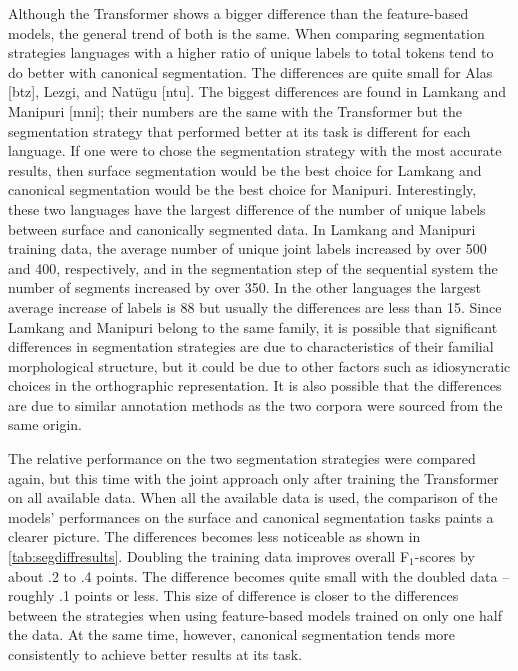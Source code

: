 Although the Transformer shows a bigger difference than the feature-based models, the general trend of both is the same. When comparing segmentation strategies languages with a higher ratio of unique labels to total tokens tend to do better with canonical segmentation. The differences are quite small for Alas [btz], Lezgi, and Nat\"ugu [ntu]. The biggest differences are found in Lamkang and Manipuri [mni]; their numbers are the same with the Transformer but the segmentation strategy that performed better at its task is different for each language. If one were to chose the segmentation strategy with the most accurate results, then surface segmentation would be the best choice for Lamkang and canonical segmentation would be the best choice for Manipuri. Interestingly, these two languages have the largest difference of the number of unique labels between surface and canonically segmented data. In Lamkang and Manipuri training data, the average number of unique joint labels increased by over 500 and 400, respectively, and in the segmentation step of the sequential system the number of segments increased by over 350. In the other languages the largest average increase of labels is 88 but usually the differences are less than 15. Since Lamkang and Manipuri belong to the same family, it is possible that significant differences in segmentation strategies are due to characteristics of their familial morphological structure, but it could be due to other factors such as idiosyncratic choices in the orthographic representation. 
It is also possible that the differences are due to similar annotation methods as the two corpora were sourced from the same origin. %

The relative performance on the two segmentation strategies were compared again, but this time with the joint approach only after training the Transformer on all available data. When all the available data is used, the comparison of the models' performances on the surface and canonical segmentation tasks paints a clearer picture.  The differences becomes less noticeable as shown in \autoref{tab:segdiffresults}. Doubling the training data improves overall F$_1$-scores by about .2 to .4 points. The difference becomes quite small with the doubled data -- roughly .1 points or less. 
This size of difference is closer to the differences between the strategies when using feature-based models trained on only one half the data. At the same time, however, canonical segmentation tends more consistently to achieve better results at its task.  


